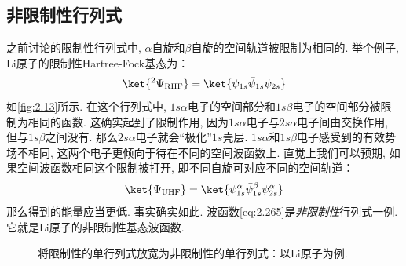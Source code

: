 \subsection{非限制性行列式}
\label{sec2.5.3}
之前讨论的限制性行列式中, 
$\alpha$自旋和$\beta$自旋的空间轨道被限制为相同的. 
举个例子, 
$\mathrm{Li}$原子的限制性Hartree-Fock基态为：
\begin{align}\label{eq:2.264}
\ket{^2\Psi_\mathrm{RHF}} = \ket{\psi_{1s}\bar{\psi}_{1s}\psi_{2s}}
\end{align} 
如\autoref{fig:2.13}所示. 
在这个行列式中, 
$1s\alpha$电子的空间部分和$1s\beta$电子的空间部分被限制为相同的函数. 
这确实起到了限制作用, 
因为$1s\alpha$电子与$2s\alpha$电子间由交换作用, 
但与$1s\beta$之间没有. 
那么$2s\alpha$电子就会``极化”$1s$壳层. 
$1s\alpha$和$1s\beta$电子感受到的有效势场不相同, 
这两个电子更倾向于待在不同的空间波函数上. 
直觉上我们可以预期, 
如果空间波函数相同这个限制被打开, 
即不同自旋可对应不同的空间轨道：
\begin{align}\label{eq:2.265}
\ket{\Psi_\mathrm{UHF}} = \ket{\psi_{1s}^\alpha\bar{\psi}_{1s}^\beta\psi_{2s}^\alpha}
\end{align}
那么得到的能量应当更低. 
事实确实如此. 
波函数\autoref{eq:2.265}是\emph{非限制性}行列式一例. 
它就是$\mathrm{Li}$原子的非限制性基态波函数.
\begin{figure}[ht]
        \centering
        \caption{将限制性的单行列式放宽为非限制性的单行列式：以$\mathrm{Li}$原子为例.}
        \label{fig:2.13}
\end{figure}

